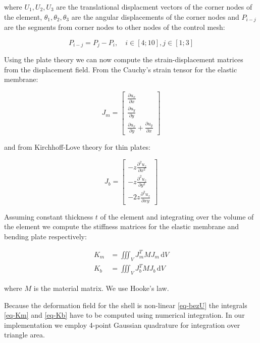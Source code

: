 \documentclass{egpubl}
\newcommand{\deriv}[2]{\frac{\partial #1}{\partial #2}}
\begin{document}
where $U_1, U_2, U_3$ are the translational displacment vectors of the
corner nodes of the element, $\theta_1, \theta_2, \theta_3$ are the angular
displacements of the corner nodes and $P_{i-j}$ are the segments from
corner nodes to other nodes of the control mesh:

\begin{equation}
    P_{i-j} = P_j-P_i, \quad i \in [4;10], j \in [1;3]
\end{equation}

Using the plate theory we can now compute the strain-displacement matrices
from the displacement field. From the Cauchy's strain tensor for the
elastic membrane:

\begin{equation}
    J_m = \left[ \begin{matrix}
        \deriv{u_x}{x} \\
        \deriv{u_y}{y} \\
        \deriv{u_x}{y} + \deriv{u_y}{x}
    \end{matrix} \right]
\end{equation}

and from Kirchhoff-Love theory for thin plates:

\begin{equation}
    J_b = \left[ \begin{matrix}
        - z \deriv{^2 u_z}{x^2} \\
        - z \deriv{^2 u_z}{y^2} \\
        - 2z \deriv{^2 u_z}{xy}
    \end{matrix} \right]
\end{equation}

Assuming constant thickness $t$ of the element and integrating over the volume
of the element we compute the stiffness matrices for the elastic membrane
and bending plate respectively:

\begin{align}
    \label{eq-Km}
    K_m & = \iiint_V J_m^T M J_m \, \mathrm{d} V \\
    \label{eq-Kb}
    K_b & = \iiint_V J_b^T M J_b \, \mathrm{d} V
\end{align}

where $M$ is the material matrix. We use Hooke's law.

Because the deformation field for the shell is non-linear \eqref{eq-bezU}
the integrals \eqref{eq-Km} and \eqref{eq-Kb} have to be computed using
numerical integration. In our implementation we employ 4-point Gaussian
quadrature for integration over triangle area.
\end{document}
